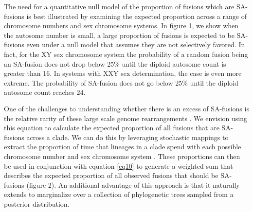 \documentclass[12pt]{article}
\begin{document}
The need for a quantitative null model of the proportion of fusions which are SA-fusions is best illustrated by examining the expected proportion across a range of chromosome numbers and sex chromosome systems.
In figure 1, we show when the autosome number is small, a large proportion of fusions is expected to be SA-fusions even under a null model that assumes they are not selectively favored. 
In fact, for the XY sex chromosome system the probability of a random fusion being an SA-fusion does not drop below 25\% until the diploid autosome count is greater than 16. 
In systems with XXY sex determination, the case is even more extreme. The probability of SA-fusion does not go below 25\% until the diploid autosome count reaches 24.

One of the challenges to understanding whether there is an excess of SA-fusions is the relative rarity of these large scale genome rearrangements \citep{blackmon2019}. %
We envision using this equation to calculate the expected proportion of all fusions that are SA-fusions across a clade.
We can do this by leveraging stochastic mappings to extract the proportion of time that lineages in a clade spend with each possible chromosome number and sex chromosome system \citep{huelsenbeck2003, revell2012}.
These proportions can then be used in conjunction with equation \ref{eq10} to generate a weighted sum that describes the expected proportion of all observed fusions that should be SA-fusions (figure 2).
An additional advantage of this approach is that it naturally extends to marginalize over a collection of phylogenetic trees sampled from a posterior distribution.











\clearpage


\end{document}
